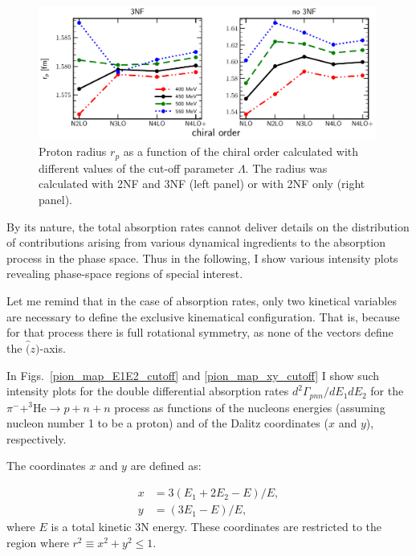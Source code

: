     \begin{figure}[h]
        \begin{center}
        \includegraphics[width=0.99\textwidth]{PlotData/PION/Dalitz_maps/figures/proton_radius_mt3-1_3NF.pdf}
        \end{center}
        \caption{ Proton radius $r_p$ as a function of the chiral order calculated with
        different values of the cut-off parameter $\Lambda$. The radius was calculated with 2NF and 3NF (left panel)
        or with 2NF only (right panel).}
        \label{proton_rad}
    \end{figure}


    By its nature, the total absorption rates cannot deliver details
    on the distribution of contributions arising from various dynamical ingredients
    to the absorption process in the phase space. Thus in the following, I show 
    various intensity plots revealing phase-space regions of special interest.

    Let me remind that in the case of absorption rates, only two kinetical variables are
    necessary to define the exclusive kinematical configuration. That is, because for that
    process there is full rotational symmetry, as none of the vectors define the $\hat(z)$-axis.


    In Figs.~\ref{pion_map_E1E2_cutoff} and \ref{pion_map_xy_cutoff} I show such
    intensity plots for the double differential absorption rates
    $d^2 \Gamma_{pnn}/dE_1dE_2$ for the $\pi^- + ^3\text{He} \rightarrow p + n + n$
    process as functions of the nucleons energies (assuming nucleon number 1 to be a proton) and 
    of the Dalitz coordinates ($x$ and $y$), respectively.

    The coordinates $x$ and $y$ are defined as:

    \begin{align}
        x &= 3 (E_1 + 2E_2 - E)/E, \nonumber\\
        y &= (3E_1 - E)/E,
        \label{dalitz_xy}
    \end{align}
    where $E$ is a total kinetic 3N energy. 
    These coordinates are restricted to the region where $r^2 \equiv x^2 + y^2 \leq 1$.

